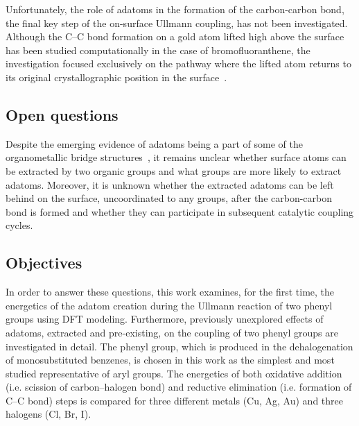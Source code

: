 \documentclass[aps,prb,amsmath,amssymb,11pt]{revtex4-1}
\begin{document}
Unfortunately, the role of adatoms in the formation of the carbon-carbon bond, the final key step of the on-surface Ullmann coupling, has not been investigated. Although the C--C bond formation on a gold atom lifted high above the surface has been studied computationally in the case of bromofluoranthene,
the investigation focused exclusively on the pathway where the lifted atom returns to its original crystallographic position in the surface~\cite{jpcc2018}. 

\ifdefined\INTERNAL
\subsection{Open questions}
\fi


Despite the emerging evidence of adatoms being a part of some of the organometallic bridge structures~\cite{acsnano2017, acsnano2019}, it remains unclear whether surface atoms can be extracted by two organic groups and what groups are more likely to extract adatoms. Moreover, it is unknown whether the extracted adatoms can be left behind on the surface, uncoordinated to any groups, after the carbon-carbon bond is formed and whether they can participate in subsequent catalytic coupling cycles.


\ifdefined\INTERNAL
\subsection{Objectives}
\fi

In order to answer these questions, this work examines, for the first time, the energetics of the adatom creation during the Ullmann reaction of two phenyl groups using DFT modeling. 
Furthermore, previously unexplored effects of adatoms, extracted and pre-existing, on the coupling of two phenyl groups are investigated in detail. 
The phenyl group, which is produced in the dehalogenation of monosubstituted benzenes, is chosen in this work as the simplest and most studied representative of aryl groups. The energetics of both oxidative addition (i.e. scission of carbon--halogen bond) and reductive elimination (i.e. formation of C--C bond) steps is compared for three different metals (Cu, Ag, Au) and three halogens (Cl, Br, I).
\end{document}
